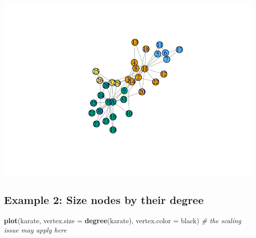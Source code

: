 \documentclass[
]{book}
\newenvironment{Shaded}{\begin{snugshade}}{\end{snugshade}}
\newcommand{\AttributeTok}[1]{\textcolor[rgb]{0.13,0.29,0.53}{#1}}
\newcommand{\CommentTok}[1]{\textcolor[rgb]{0.56,0.35,0.01}{\textit{#1}}}
\newcommand{\DecValTok}[1]{\textcolor[rgb]{0.00,0.00,0.81}{#1}}
\newcommand{\FunctionTok}[1]{\textcolor[rgb]{0.13,0.29,0.53}{\textbf{#1}}}
\newcommand{\NormalTok}[1]{#1}
\newcommand{\OtherTok}[1]{\textcolor[rgb]{0.56,0.35,0.01}{#1}}
\newcommand{\SpecialCharTok}[1]{\textcolor[rgb]{0.81,0.36,0.00}{\textbf{#1}}}
\newcommand{\StringTok}[1]{\textcolor[rgb]{0.31,0.60,0.02}{#1}}
\begin{document}
\begin{Shaded}
\end{Shaded}

\includegraphics{bookdown-demo_files/figure-latex/unnamed-chunk-130-1.pdf}

\subsection{Example 2: Size nodes by their degree}\label{example-2-size-nodes-by-their-degree}

\begin{Shaded}
\begin{Highlighting}[]
\FunctionTok{plot}\NormalTok{(karate, }\AttributeTok{vertex.size =} \FunctionTok{degree}\NormalTok{(karate), }\AttributeTok{vertex.color =} \StringTok{\textquotesingle{}black\textquotesingle{}}\NormalTok{) }\CommentTok{\# the scaling issue may apply here }
\end{Highlighting}
\end{Shaded}
\end{document}
